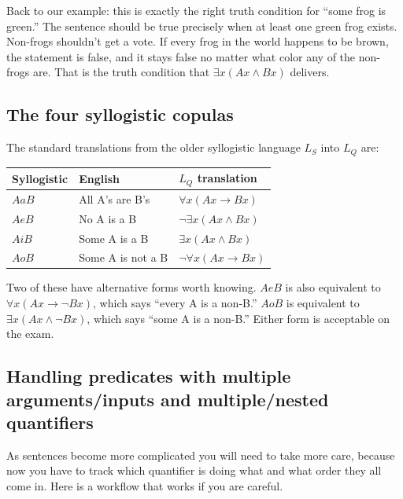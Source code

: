 \documentclass[11pt]{article}
\begin{document}
Back to our example: this is exactly the right truth condition for ``some frog is green.'' The sentence should be true precisely when at least one green frog exists. Non-frogs shouldn't get a vote. If every frog in the world happens to be brown, the statement is false, and it stays false no matter what color any of the non-frogs are. That is the truth condition that $\exists x(Ax \wedge Bx)$ delivers.

\subsection{The four syllogistic copulas}

The standard translations from the older syllogistic language $L_S$ into $L_Q$ are:

\begin{center}
\begin{tabular}{|l|l|l|}
\hline
\textbf{Syllogistic} & \textbf{English} & \textbf{$L_Q$ translation}\\
\hline
$AaB$ & All A's are B's & $\forall x(Ax \to Bx)$\\
$AeB$ & No A is a B & $\neg \exists x(Ax \wedge Bx)$\\
$AiB$ & Some A is a B & $\exists x(Ax \wedge Bx)$\\
$AoB$ & Some A is not a B & $\neg \forall x(Ax \to Bx)$\\
\hline
\end{tabular}
\end{center}

Two of these have alternative forms worth knowing. $AeB$ is also equivalent to $\forall x(Ax \to \neg Bx)$, which says ``every A is a non-B.'' $AoB$ is equivalent to $\exists x(Ax \wedge \neg Bx)$, which says ``some A is a non-B.'' Either form is acceptable on the exam.

\subsection{Handling predicates with multiple arguments/inputs and multiple/nested quantifiers}

As sentences become more complicated you will need to take more care, because now you have to track which quantifier is doing what and what order they all come in. Here is a workflow that works if you are careful.
\end{document}
